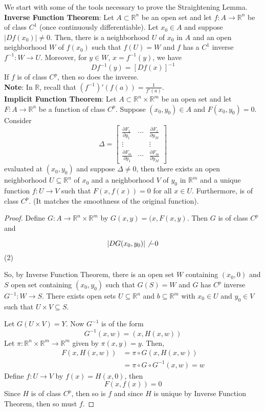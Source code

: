 \documentclass[12pt]{article}
\begin{document}
\noindent We start with some of the tools necessary to prove the Straightening Lemma. \\

\noindent \textbf{Inverse Function Theorem}: Let $A \subset \mathbb{R}^n$ be an open set and let $f: A\rightarrow \mathbb{R}^n$ be of class $C^1$ (once continuously differentiable). Let $x_0 \in A$ and suppose $\vert Df(x_0)\vert\not = 0$. Then, there is a neighborhood $U$ of $x_0$ in $A$ and an open neighborhood $W$ of $f(x_0)$ such that $f(U) = W$ and $f$ has a $C^1$ inverse $f^{-1}: W \rightarrow U$. Moreover, for $y \in W$, $x = f^{-1}(y)$, we have 
$$Df^{-1}(y) = [Df(x)]^{-1}$$
If $f$ is of class $C^p$, then so does the inverse. \\

\noindent \textbf{Note}: In $\mathbb{R}$, recall that $(f^{-1})' (f(a)) = \frac{1}{f'(a)}$. \\

\noindent \textbf{Implicit Function Theorem}: 
\noindent Let $A \subset \mathbb{R}^n \times \mathbb{R}^m$ be an open set and let $F:A \rightarrow \mathbb{R}^n$ be a function of class $C^p$. Suppose $(x_0,y_0) \in A$ and $F(x_0,y_0) = 0$. Consider
$$\Delta = \begin{bmatrix} \frac{\partial F_1}{\partial y_1} & \cdots &  \frac{\partial F_1}{\partial y_M} \\
\vdots & & \vdots \\ \frac{\partial F_m}{\partial y_1} & \cdots &  \frac{\partial F_m}{\partial y_M} \end{bmatrix}$$
evaluated at $(x_0, y_0)$ and suppose $\Delta \not = 0$, then there exists an open neighborhood $U \subseteq \mathbb{R}^n$ of $x_0$ and a neighborhood $V$ of $y_0$ in $\mathbb{R}^m$ and a unique function $f: U \rightarrow  V$ such that $F(x,f(x)) = 0$ for all $x \in U$. Furthermore, is of class $C^p$. (It matches the smoothness of the original function). 

\begin{proof}
Define $G: A \rightarrow \mathbb{R}^n \times \mathbb{R}^m$ by $G(x,y) = (x, F(x,y)$. Then $G$ is of class $C^p$ and 

$$\vert DG(x_0,y_0)\vert \not - 0$$
(2)

So, by Inverse Function Theorem, there is an open set $W$ containing $(x_0,0)$ and $S$ open set containing $(x_0,y_0)$ such that $G(S) = W$ and $G$ has $C^p$ inverse $G^{-1}:W \rightarrow S$. There exists open sets $U \subseteq \mathbb{R}^n$ and $b \subseteq \mathbb{R}^m$ with $x_0 \in U$ and $y_0 \in V$ such that $U \times V \subseteq S$.  

Let $G(U \times V) = Y$. Now $G^{-1}$ is of the form
$$G^{-1}(x,w) = (x, H(x,w))$$
Let $\pi: \mathbb{R}^n \times \mathbb{R}^m \rightarrow \mathbb{R}^m$ given by $\pi(x,y)=y$. Then,
\begin{align*}
F(x,H(x,w)) &= \pi \circ G(x, H(x,w)) \\
&= \pi \circ G \circ G^{-1}(x,w) = w
\end{align*}
Define $f: U \rightarrow V$ by $f(x) = H(x,0)$, then 
$$F(x,f(x)) = 0$$
Since $H$ is of class $C^p$, then so is $f$ and since $H$ is unique by Inverse Function Theorem, then so must $f$. 
\end{proof}
\end{document}
